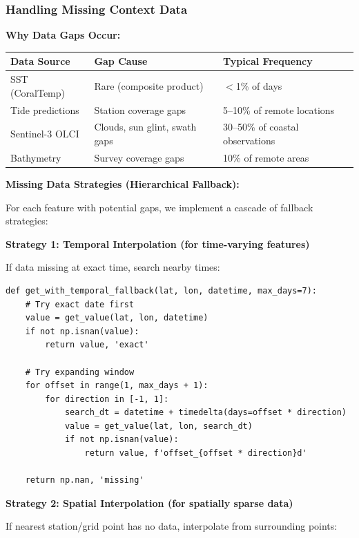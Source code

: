 \documentclass[11pt]{article}
\begin{document}
\subsubsection{Handling Missing Context Data}

\textbf{Why Data Gaps Occur:}

\begin{center}
\begin{tabular}{lll}
\toprule
\textbf{Data Source} & \textbf{Gap Cause} & \textbf{Typical Frequency} \\
\midrule
SST (CoralTemp) & Rare (composite product) & $<$1\% of days \\
Tide predictions & Station coverage gaps & 5--10\% of remote locations \\
Sentinel-3 OLCI & Clouds, sun glint, swath gaps & 30--50\% of coastal observations \\
Bathymetry & Survey coverage gaps & 10\% of remote areas \\
\bottomrule
\end{tabular}
\end{center}

\textbf{Missing Data Strategies (Hierarchical Fallback):}

For each feature with potential gaps, we implement a cascade of fallback strategies:

\textbf{Strategy 1: Temporal Interpolation (for time-varying features)}

If data missing at exact time, search nearby times:

\begin{verbatim}
def get_with_temporal_fallback(lat, lon, datetime, max_days=7):
    # Try exact date first
    value = get_value(lat, lon, datetime)
    if not np.isnan(value):
        return value, 'exact'

    # Try expanding window
    for offset in range(1, max_days + 1):
        for direction in [-1, 1]:
            search_dt = datetime + timedelta(days=offset * direction)
            value = get_value(lat, lon, search_dt)
            if not np.isnan(value):
                return value, f'offset_{offset * direction}d'

    return np.nan, 'missing'
\end{verbatim}

\textbf{Strategy 2: Spatial Interpolation (for spatially sparse data)}

If nearest station/grid point has no data, interpolate from surrounding points:
\end{document}
